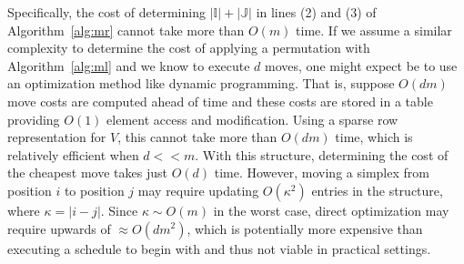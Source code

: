 \documentclass{siamart190516}
\begin{document}
Specifically, the cost of determining $\lvert \mathbb{I}\rvert + \lvert \mathbb{J}\rvert$ in lines (2) and (3) of Algorithm~\ref{alg:mr} cannot take more than $O(m)$ time. If we assume a similar complexity to determine the cost of applying a permutation with Algorithm~\ref{alg:ml} and we know to execute $d$ moves, one might expect be to use an optimization method like dynamic programming. 
That is, suppose $O(dm)$ move costs are computed ahead of time and these costs are stored in a table providing $O(1)$ element access and modification. Using a sparse row representation for $V$, this cannot take more than $O(dm)$ time, which is relatively efficient when $d << m$. With this structure, determining the cost of the cheapest move takes just $O(d)$ time. However, moving a simplex from position $i$ to position $j$ may require updating $O(\kappa^2)$ entries in the structure, where $\kappa = \lvert i - j \rvert$. Since $\kappa \sim O(m)$ in the worst case, direct optimization may require upwards of $\approx O(dm^2)$, which is potentially more expensive than executing a schedule to begin with and thus not viable in practical settings. 



\end{document}
